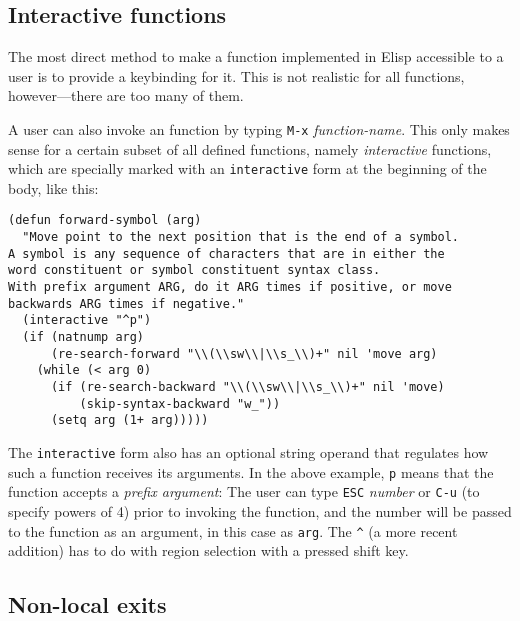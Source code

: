 \documentclass[format=acmsmall, review=false, screen=true]{acmart}
\newcommand \Elisp {Elisp}
\begin{document}
\subsection{Interactive functions}
\label{sec:interactive-functions}

The most direct method to make a function implemented in \Elisp{}
accessible to a user is to provide a keybinding for it.  This is not
realistic for all functions, however---there are too many of them.

A user can also invoke an function by typing \texttt{M-x}
\emph{function-name}.  This only makes sense for a certain subset of
all defined functions, namely \emph{interactive} functions, which
are specially marked with an \texttt{interactive} form at the
beginning of the body, like this:
%
\begin{verbatim}
(defun forward-symbol (arg)
  "Move point to the next position that is the end of a symbol.
A symbol is any sequence of characters that are in either the
word constituent or symbol constituent syntax class.
With prefix argument ARG, do it ARG times if positive, or move
backwards ARG times if negative."
  (interactive "^p")
  (if (natnump arg)
      (re-search-forward "\\(\\sw\\|\\s_\\)+" nil 'move arg)
    (while (< arg 0)
      (if (re-search-backward "\\(\\sw\\|\\s_\\)+" nil 'move)
          (skip-syntax-backward "w_"))
      (setq arg (1+ arg)))))
\end{verbatim}
%
The \texttt{interactive} form also has an optional string operand that
regulates how such a function receives its arguments.  In the above
example, \verb|p| means that the function accepts a \emph{prefix
  argument}: The user can type \texttt{ESC} \emph{number} or
\texttt{C-u} (to specify powers of 4) prior to invoking the function,
and the number will be passed to the function as an argument, in this
case as \texttt{arg}.  The \verb|^| (a more recent addition) has to do with
region selection with a pressed shift key.

\subsection{Non-local exits}
\label{sec:non-local-exits}
\end{document}
